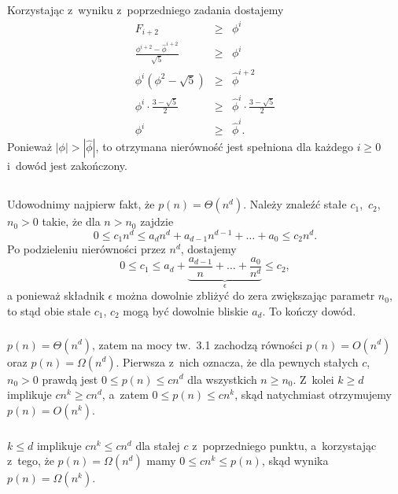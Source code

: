 \subsection{} %
Korzystając z~wyniku z~poprzedniego zadania dostajemy
\begin{eqnarray*}
	F_{i+2} &\ge& \phi^i \\
	\frac{\phi^{i+2}-\widehat\phi^{i+2}}{\sqrt{5}} &\ge& \phi^i \\
	\phi^i\left(\phi^2-\sqrt{5}\right) &\ge& \widehat\phi^{i+2} \\
	\phi^i\cdot\frac{3-\sqrt{5}}{2} &\ge& \widehat\phi^i\cdot\frac{3-\sqrt{5}}{2} \\
	\phi^i &\ge& \widehat\phi^i.
\end{eqnarray*}
Ponieważ $|\phi|>|\widehat\phi|$, to otrzymana nierówność jest spełniona dla każdego $i\ge0$ i~dowód jest zakończony.

\problems

\subsection{} %
Udowodnimy najpierw fakt, że $p(n)=\Theta(n^d)$. Należy znaleźć stałe $c_1$,~$c_2$,~$n_0>0$ takie, że dla $n>n_0$ zajdzie
\[
	0 \le c_1n^d \le a_dn^d+a_{d-1}n^{d-1}+\dots+a_0 \le c_2n^d.
\]
Po podzieleniu nierówności przez $n^d$, dostajemy
\[
	0 \le c_1 \le a_d+\underbrace{\frac{a_{d-1}}{n}+\dots+\frac{a_0}{n^d}}_\epsilon \le c_2,
\]
a ponieważ składnik $\epsilon$ można dowolnie zbliżyć do zera zwiększając parametr $n_0$, to stąd obie stałe $c_1$, $c_2$ mogą być dowolnie bliskie $a_d$. To kończy dowód.

\subsubsection{} %
$p(n)=\Theta(n^d)$, zatem na mocy tw.~3.1 zachodzą równości $p(n)=O(n^d)$ oraz $p(n)=\Omega(n^d)$. Pierwsza z~nich oznacza, że dla pewnych stałych $c$,~$n_0>0$ prawdą jest $0\le p(n)\le cn^d$ dla wszystkich $n\ge n_0$. Z~kolei $k\ge d$ implikuje $cn^k\ge cn^d$, a~zatem $0\le p(n)\le cn^k$, skąd natychmiast otrzymujemy $p(n)=O(n^k)$.

\subsubsection{} %
$k\le d$ implikuje $cn^k\le cn^d$ dla stałej $c$ z~poprzedniego punktu, a~korzystając z~tego, że $p(n)=\Omega(n^d)$ mamy $0\le cn^k\le p(n)$, skąd wynika $p(n)=\Omega(n^k)$.

